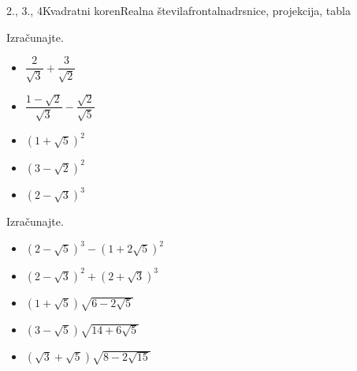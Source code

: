 \begin{priprava}{2., 3., 4}{}{Kvadratni koren}{Realna števila}{frontalna}{drsnice, projekcija, tabla}
\begin{multicols}{2}
        
            \begin{naloga}
                Izračunajte.
                \begin{itemize}
                        \item $\dfrac{2}{\sqrt{3}}+\dfrac{3}{\sqrt{2}}$ 
                        \item $\dfrac{1-\sqrt{2}}{\sqrt{3}}-\dfrac{\sqrt{2}}{\sqrt{5}}$ 
                        \item $\left(1+\sqrt{5}\right)^2$ 
                        \item $\left(3-\sqrt{2}\right)^2$ 
                        \item $\left(2-\sqrt{3}\right)^3$ 
                \end{itemize}
            \end{naloga}
        


        
        
            \begin{naloga}
                Izračunajte.
                \begin{itemize}
                        \item $\left(2-\sqrt{5}\right)^3-\left(1+2\sqrt{5}\right)^2$ 
                        \item $\left(2-\sqrt{3}\right)^2+\left(2+\sqrt{3}\right)^3$ 
                        \item $\left(1+\sqrt{5}\right)\sqrt{6-2\sqrt{5}}$ 
                        \item $\left(3-\sqrt{5}\right)\sqrt{14+6\sqrt{5}}$ 
                        \item $\left(\sqrt{3}+\sqrt{5}\right)\sqrt{8-2\sqrt{15}}$ 
                \end{itemize}
            \end{naloga}

            ~~~~~~~~~~~~\\
            
        \end{multicols}

    
\end{priprava}